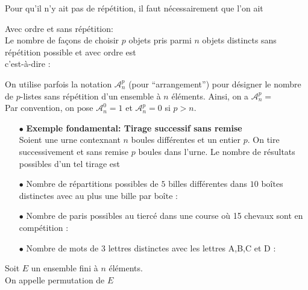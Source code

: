 \documentclass[a4paper, 11pt]{article}
\begin{document}
\begin{rem}
Pour qu'il n'y ait pas de r\'ep\'etition, il faut n\'ecessairement que l'on ait \dotfill
\end{rem}



\begin{prop} Avec ordre et sans r\'ep\'etition:\\
Le nombre de fa\c{c}ons de choisir $p$ objets pris parmi $n$ objets distincts sans r\'ep\'etition possible et avec ordre est \dotfill \\
c'est-\`a-dire :\vsec\vsec%
\end{prop}

\begin{rem}
On utilise parfois la notation $\mathcal{A}_n^p$ (pour ``arrangement'') pour d\'esigner le nombre de $p$-listes sans r\'ep\'etition d'un ensemble \`a $n$ \'el\'ements. Ainsi, on a $\mathcal{A}_n^p =$ \dotfill\\
Par convention, on pose $\mathcal{A}_n^0 = 1$ et $\mathcal{A}_n^p=0$ si $p>n$.
\end{rem}

\noindent  \begin{exemples} 
\begin{itemize}
\item[$\bullet$] \textbf{Exemple fondamental: Tirage successif sans remise}\\
\noindent Soient une urne contexnant $n$ boules diff\'erentes et un entier $p$. On tire successivement et sans remise $p$ boules dans l'urne. Le nombre de r\'esultats possibles d'un tel tirage est \dotfill\vsec
\item[$\bullet$] Nombre de r\'epartitions possibles de $5$ billes diff\'erentes dans $10$ bo\^{i}tes distinctes avec au plus une bille par bo\^{i}te : \dotfill\vsec
\item[$\bullet$] Nombre de paris possibles au tierc\'e dans une course o\`u 15 chevaux sont en comp\'etition : \dotfill\vsec
\item[$\bullet$] Nombre de mots de 3 lettres distinctes avec les lettres A,B,C et D : \dotfill
\end{itemize}
\end{exemples}\vsec



\begin{defi}  
Soit $E$ un ensemble fini \`a $n$ \'el\'ements. \\
\noindent On appelle permutation de $E$ \dotfill
\end{defi}
 
\end{document}
